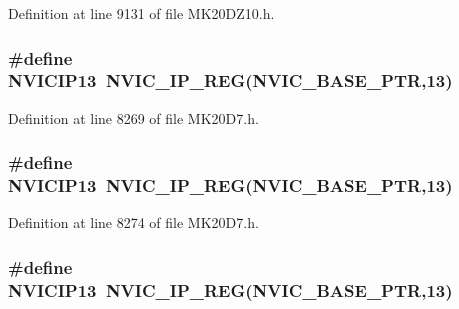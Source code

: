 Definition at line 9131 of file M\+K20\+D\+Z10.\+h.

\subsubsection[{\texorpdfstring{N\+V\+I\+C\+I\+P13}{NVICIP13}}]{\setlength{\rightskip}{0pt plus 5cm}\#define N\+V\+I\+C\+I\+P13~{\bf N\+V\+I\+C\+\_\+\+I\+P\+\_\+\+R\+EG}({\bf N\+V\+I\+C\+\_\+\+B\+A\+S\+E\+\_\+\+P\+TR},13)}\hypertarget{group___n_v_i_c___register___accessor___macros_gab92c812741f8a4d4b3460a19f3d95ab6}{}\label{group___n_v_i_c___register___accessor___macros_gab92c812741f8a4d4b3460a19f3d95ab6}


Definition at line 8269 of file M\+K20\+D7.\+h.

\subsubsection[{\texorpdfstring{N\+V\+I\+C\+I\+P13}{NVICIP13}}]{\setlength{\rightskip}{0pt plus 5cm}\#define N\+V\+I\+C\+I\+P13~{\bf N\+V\+I\+C\+\_\+\+I\+P\+\_\+\+R\+EG}({\bf N\+V\+I\+C\+\_\+\+B\+A\+S\+E\+\_\+\+P\+TR},13)}\hypertarget{group___n_v_i_c___register___accessor___macros_gab92c812741f8a4d4b3460a19f3d95ab6}{}\label{group___n_v_i_c___register___accessor___macros_gab92c812741f8a4d4b3460a19f3d95ab6}


Definition at line 8274 of file M\+K20\+D7.\+h.

\subsubsection[{\texorpdfstring{N\+V\+I\+C\+I\+P13}{NVICIP13}}]{\setlength{\rightskip}{0pt plus 5cm}\#define N\+V\+I\+C\+I\+P13~{\bf N\+V\+I\+C\+\_\+\+I\+P\+\_\+\+R\+EG}({\bf N\+V\+I\+C\+\_\+\+B\+A\+S\+E\+\_\+\+P\+TR},13)}\hypertarget{group___n_v_i_c___register___accessor___macros_gab92c812741f8a4d4b3460a19f3d95ab6}{}\label{group___n_v_i_c___register___accessor___macros_gab92c812741f8a4d4b3460a19f3d95ab6}



